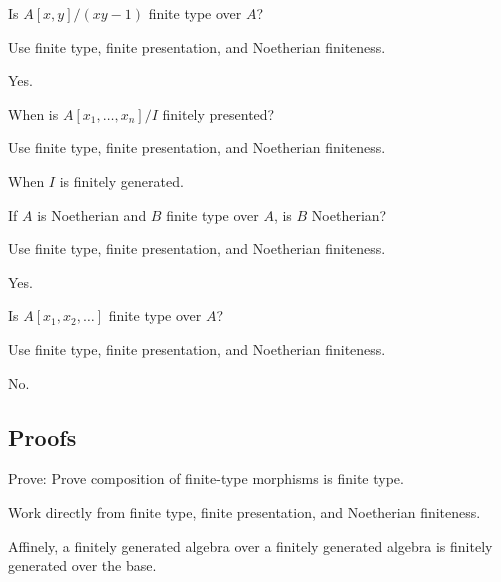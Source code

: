 \begin{exercise}\label{exr:vi26-expand-02}
Is $A[x,y]/(xy-1)$ finite type over $A$?
\end{exercise}
\begin{hint}
Use finite type, finite presentation, and Noetherian finiteness.
\end{hint}
\begin{solution}
Yes.
\end{solution}

\begin{exercise}\label{exr:vi26-expand-03}
When is $A[x_1,\ldots,x_n]/I$ finitely presented?
\end{exercise}
\begin{hint}
Use finite type, finite presentation, and Noetherian finiteness.
\end{hint}
\begin{solution}
When $I$ is finitely generated.
\end{solution}

\begin{exercise}\label{exr:vi26-expand-04}
If $A$ is Noetherian and $B$ finite type over $A$, is $B$ Noetherian?
\end{exercise}
\begin{hint}
Use finite type, finite presentation, and Noetherian finiteness.
\end{hint}
\begin{solution}
Yes.
\end{solution}

\begin{exercise}\label{exr:vi26-expand-05}
Is $A[x_1,x_2,\ldots]$ finite type over $A$?
\end{exercise}
\begin{hint}
Use finite type, finite presentation, and Noetherian finiteness.
\end{hint}
\begin{solution}
No.
\end{solution}

\subsection*{Proofs}

\begin{exercise}\label{exr:vi26-expand-06}
Prove: Prove composition of finite-type morphisms is finite type.
\end{exercise}
\begin{hint}
Work directly from finite type, finite presentation, and Noetherian finiteness.
\end{hint}
\begin{solution}
Affinely, a finitely generated algebra over a finitely generated algebra is finitely generated over the base.
\end{solution}

